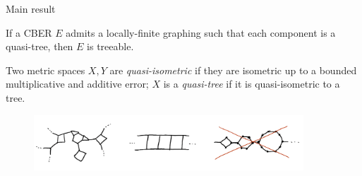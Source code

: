 \documentclass{beamer}
\begin{document}
    \begin{frame}{Main result}
        \begin{theorem}
            If a CBER $E$ admits a locally-finite graphing such that each component is a quasi-tree, then $E$ is treeable.
        \end{theorem}

        \pause
        \vspace{0.1in}

        \scriptsize{
            Two metric spaces $X,Y$ are \textit{quasi-isometric} if they are isometric up to a bounded multiplicative and additive error; $X$ is a \textit{quasi-tree} if it is quasi-isometric to a tree.
            \vspace{-0.3in}
            \begin{figure}[h]
                \center
                \includegraphics[width=0.9\textwidth]{img/quasi_tree.png}
            \end{figure}
        }
    \end{frame}
\end{document}
